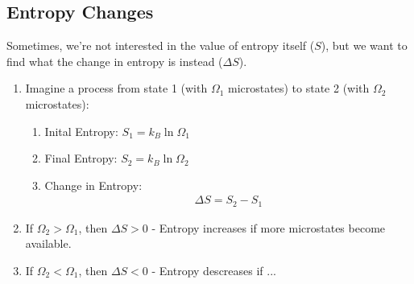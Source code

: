 \documentclass{article}  %
\begin{document}
\subsection*{Entropy Changes}
Sometimes, we're not interested in the value of entropy itself ($S$), but we want to find what the change in entropy is instead ($\Delta S$).
\begin{enumerate}
    \item Imagine a process from state 1 (with $\Omega_1$ microstates) to state 2 (with $\Omega_2$ microstates):
        \begin{enumerate}
            \item Inital Entropy: $S_1 = k_B \ln \Omega_1$
            \item Final Entropy: $S_2 = k_B \ln \Omega_2$
            \item Change in Entropy: 
                \begin{equation*}
                    \begin{aligned}
                        \Delta S = S_2 - S_1 
                    \end{aligned}
                \end{equation*}
        \end{enumerate}
    \item If $\Omega_2 > \Omega_1$, then $\Delta S > 0$ - Entropy increases if more microstates become available.
    \item If $\Omega_2 < \Omega_1$, then $\Delta S < 0$ - Entropy descreases if ... %
\end{enumerate}
\end{document}

